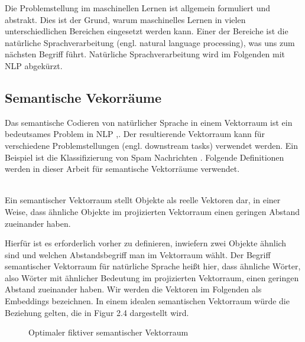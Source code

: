 \documentclass[12pt,letterpaper,ngerman]{article}
\begin{document}
Die Problemstellung im maschinellen Lernen ist allgemein formuliert und abstrakt.
Dies ist der Grund, warum maschinelles Lernen in vielen unterschiedlichen 
Bereichen eingesetzt werden kann. Einer der Bereiche ist die natürliche
Sprachverarbeitung (engl. natural language processing), was uns zum nächsten 
Begriff führt. Natürliche Sprachverarbeitung wird im Folgenden 
mit NLP abgekürzt.

\subsection{Semantische Vekorräume}
Das semantische Codieren von natürlicher Sprache in einem Vektorraum 
ist ein bedeutsames Problem in NLP
\cite{word2vec} ,\cite{reimers-2019-sentence-bert}.
Der resultierende Vektorraum kann
für verschiedene Problemstellungen (engl. downstream tasks) verwendet
werden. Ein Beispiel ist die Klassifizierung von Spam Nachrichten 
\cite{Ball2019}. Folgende Definitionen werden in dieser Arbeit 
für semantische Vektorräume verwendet.
\begin{definition}
  \hfill\\
  Ein semantischer Vektorraum stellt Objekte als reelle Vektoren 
  dar, in einer Weise, dass ähnliche Objekte im projizierten 
  Vektorraum einen geringen Abstand zueinander haben.
\end{definition}
Hierfür ist es erforderlich vorher zu definieren, inwiefern zwei
Objekte ähnlich sind und welchen Abstandsbegriff man im Vektorraum 
wählt.
Der Begriff semantischer Vektorraum für natürliche Sprache heißt hier,
dass ähnliche Wörter, also Wörter mit ähnlicher Bedeutung 
im projizierten Vektorraum, einen geringen Abstand zueinander haben. Wir werden die Vektoren im Folgenden als Embeddings bezeichnen. In einem idealen semantischen Vektorraum würde 
die Beziehung gelten, die in Figur 2.4 dargestellt wird.\\
\begin{figure}[H]
  \begin{center}
  \end{center}
  \caption{Optimaler fiktiver semantischer Vektorraum}
\end{figure}
\end{document}

